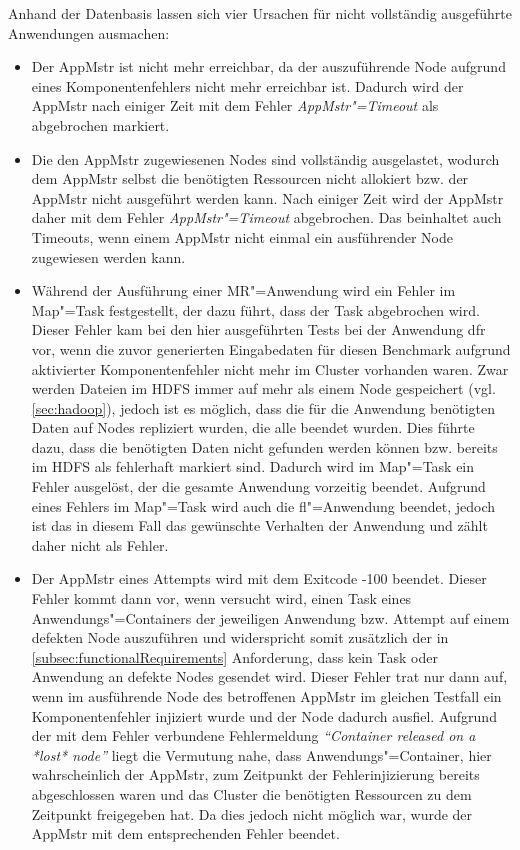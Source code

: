 Anhand der Datenbasis lassen sich vier Ursachen für nicht vollständig ausgeführte Anwendungen ausmachen:

\begin{itemize}
    \item
        Der \ac{AppMstr} ist nicht mehr erreichbar, da der auszuführende Node aufgrund eines Komponentenfehlers nicht mehr erreichbar ist.
        Dadurch wird der \ac{AppMstr} nach einiger Zeit mit dem Fehler \emph{\ac{AppMstr}"=Timeout} als abgebrochen markiert.
    \item
        Die den \ac{AppMstr} zugewiesenen Nodes sind vollständig ausgelastet, wodurch dem \ac{AppMstr} selbst die benötigten Ressourcen nicht allokiert bzw. der \ac{AppMstr} nicht ausgeführt werden kann.
        Nach einiger Zeit wird der \ac{AppMstr} daher mit dem Fehler \emph{\ac{AppMstr}"=Timeout} abgebrochen.
        Das beinhaltet auch Timeouts, wenn einem \ac{AppMstr} nicht einmal ein ausführender Node zugewiesen werden kann.
    \item
        Während der Ausführung einer \ac{MR}"=Anwendung wird ein Fehler im Map"=Task festgestellt, der dazu führt, dass der Task abgebrochen wird.
        Dieser Fehler kam bei den hier ausgeführten Tests bei der Anwendung \acl{dfr} vor, wenn die zuvor generierten Eingabedaten für diesen Benchmark aufgrund aktivierter Komponentenfehler nicht mehr im Cluster vorhanden waren.
        Zwar werden Dateien im \ac{HDFS} immer auf mehr als einem Node gespeichert (vgl. \cref{sec:hadoop}), jedoch ist es möglich, dass die für die Anwendung benötigten Daten auf Nodes repliziert wurden, die alle beendet wurden.
        Dies führte dazu, dass die benötigten Daten nicht gefunden werden können bzw. bereits im \ac{HDFS} als fehlerhaft markiert sind.
        Dadurch wird im Map"=Task ein Fehler ausgelöst, der die gesamte Anwendung vorzeitig beendet.
        Aufgrund eines Fehlers im Map"=Task wird auch die \acl{fl}"=Anwendung beendet, jedoch ist das in diesem Fall das gewünschte Verhalten der Anwendung und zählt daher nicht als Fehler.
    \item
        Der \ac{AppMstr} eines Attempts wird mit dem Exitcode -100 beendet.
        Dieser Fehler kommt dann vor, wenn versucht wird, einen Task eines Anwendungs"=Containers der jeweiligen Anwendung bzw. Attempt auf einem defekten Node auszuführen und widerspricht somit zusätzlich der in \cref{subsec:functionalRequirements} Anforderung, dass kein Task oder Anwendung an defekte Nodes gesendet wird.
        Dieser Fehler trat nur dann auf, wenn im ausführende Node des betroffenen \ac{AppMstr} im gleichen Testfall ein Komponentenfehler injiziert wurde und der Node dadurch ausfiel.
        Aufgrund der mit dem Fehler verbundene Fehlermeldung \textit{\enquote{Container released on a *lost* node}} liegt die Vermutung nahe, dass Anwendungs"=Container, hier wahrscheinlich der \ac{AppMstr}, zum Zeitpunkt der Fehlerinjizierung bereits abgeschlossen waren und das Cluster die benötigten Ressourcen zu dem Zeitpunkt freigegeben hat.
        Da dies jedoch nicht möglich war, wurde der \ac{AppMstr} mit dem entsprechenden Fehler beendet.
\end{itemize}

